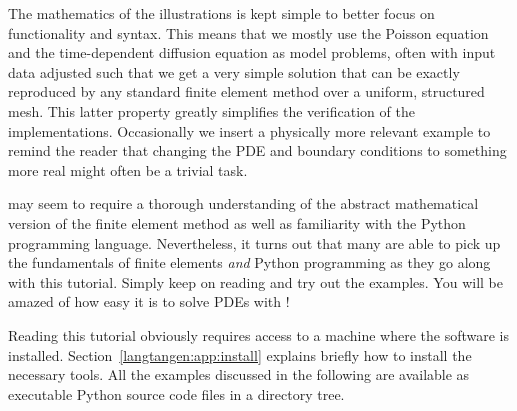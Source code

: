 \enlargethispage{-12pt}

\noindent
The mathematics of the illustrations is kept simple to better focus
on \fenics{} functionality and syntax. This means that we mostly use
the Poisson equation and the time-dependent diffusion equation as model
problems, often with input data adjusted such that we get a very simple
solution that can be exactly reproduced by any standard finite element
method over a uniform, structured mesh. This latter property greatly
simplifies the verification of the implementations.  Occasionally we
insert a physically more relevant example to remind the reader that
changing the PDE and boundary conditions to something more real might
often be a trivial task.

\clearpage

\fenics{} may seem to require a thorough understanding of the abstract
mathematical version of the finite element method as well as familiarity
with the Python programming language.  Nevertheless, it turns out that
many are able to pick up the fundamentals of finite elements \emph{and}
Python programming as they go along with this tutorial. Simply keep on
reading and try out the examples. You will be amazed of how easy it is
to solve PDEs with \fenics{}!


Reading this tutorial obviously requires access to a machine where the
\fenics{} software is installed. Section~\ref{langtangen:app:install}
explains briefly how to install the necessary tools.
All the examples discussed in the following are available as
executable Python source code files in a directory tree.



